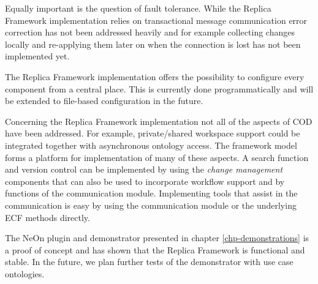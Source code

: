 Equally important is the question of fault tolerance. While the
Replica Framework implementation relies on transactional message communication
error correction has not been addressed heavily and for example
collecting changes locally and re-applying them later on when the connection
is lost has not been implemented yet.

The Replica Framework implementation offers the possibility to configure
every component from a central place. This is currently done programmatically
and will be extended to file-based configuration in the future.

Concerning the Replica Framework implementation not all of the aspects of
COD have been addressed. For example,
private/shared workspace support could be integrated together with
asynchronous ontology access. The framework model forms a platform for implementation of many of these aspects. A search function and version control can be implemented
by using the \emph{change management} components that can also be used
to incorporate workflow support and by functions of
the communication module. Implementing tools that assist in the
communication is easy by using the communication module or the underlying
ECF methods directly.


The NeOn plugin and demonstrator presented in chapter \ref{chp-demonstrations} is a proof of
concept and has shown that the Replica Framework is functional and stable.
In the future, we plan further tests of  the demonstrator with use case ontologies.





